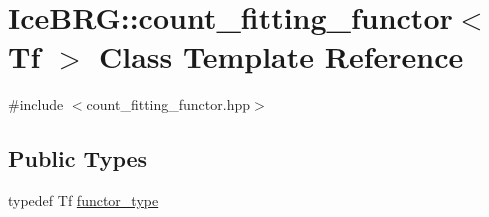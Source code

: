\hypertarget{classIceBRG_1_1count__fitting__functor}{}\section{Ice\+B\+R\+G\+:\+:count\+\_\+fitting\+\_\+functor$<$ Tf $>$ Class Template Reference}
\label{classIceBRG_1_1count__fitting__functor}


{\ttfamily \#include $<$count\+\_\+fitting\+\_\+functor.\+hpp$>$}

\subsection*{Public Types}
\begin{DoxyCompactItemize}
\item 
typedef Tf \hyperlink{classIceBRG_1_1count__fitting__functor_a681f2697a3ad0a5aa13882f0fba0e170}{functor\+\_\+type}
\end{DoxyCompactItemize}
